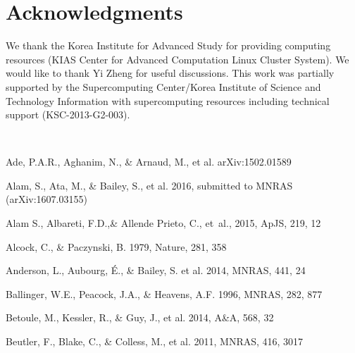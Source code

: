 \documentclass[iop]{emulateapj}
\begin{document}
\section*{Acknowledgments}

We thank the Korea Institute for Advanced Study for providing computing resources (KIAS Center for Advanced Computation Linux Cluster System).
We would like to thank Yi Zheng for useful discussions.
This work was partially supported by the
Supercomputing Center/Korea Institute of Science and
Technology Information with supercomputing resources
including technical support (KSC-2013-G2-003).

\appendix

\

\begin{thebibliography}{}

Ade, P.A.R., Aghanim, N., \& Arnaud, M., et al. arXiv:1502.01589

Alam, S., Ata, M., \& Bailey, S., et al. 2016,
submitted to MNRAS (arXiv:1607.03155)

{Alam} S., Albareti, F.D.,\& Allende Prieto, C., {et~al.}, 2015,  ApJS, 219, 12

Alcock, C., \& Paczynski, B. 1979, Nature, 281, 358  


Anderson, L., Aubourg, \'E., \& Bailey, S. et al. 2014, MNRAS, 441, 24  
  

Ballinger, W.E., Peacock, J.A., \& Heavens, A.F. 1996, MNRAS, 282, 877  

Betoule, M., Kessler, R., \& Guy, J., et al. 2014, A\&A, 568, 32


Beutler, F., Blake, C., \& Colless, M., et al. 2011, MNRAS, 416, 3017


\end{thebibliography}
\end{document}
